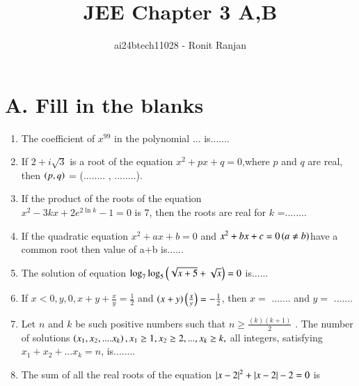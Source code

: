\documentclass[journal,12pt,twocolumn]{IEEEtran}
\theoremstyle{remark}
\begin{document}

\vspace{3cm}

\title{JEE Chapter 3 A,B}
\author{ai24btech11028 - Ronit Ranjan}
\maketitle
\newpage
\bigskip
\section*{A. Fill in the blanks}
\begin{enumerate}
    \item The coefficient of $x^{99}$ in the polynomial ...
    is.......\hfill {}
    
    \item If $2+i\sqrt{3}$ is a root of the equation $x^2 + px +q =0$,where $p$ and $q$ are real, then $\left(p,q\right)$ = (........ , ........).\hfill {}
    
    \item If the product of the roots of the equation\\ $x^2 -3kx +2e^{2\ln{k}} -1=0$ is $7$, then the roots are real for $k$ =........\hfill {}
    
    \item If the quadratic equation $x^2 + ax +b=0$ and $x^2 + bx + c=0 \left(a \ne b\right)$have a common root then value of a+b is......\hfill {}
    
    \item The solution of equation $\log_{7}\log_{5}\left(\sqrt{x+5}+\sqrt{x}\right)=0$ is......\hfill {}
    
    \item If $x<0, y,0, x + y + \frac{x}{y} = \frac{1}{2}$ and $\left(x+y\right)\left(\frac{x
    }{y}\right) = -\frac{1}{2}$, then $x=$ ....... and $y=$ .......\hfill {}
    
    \item Let $n$ and $k$ be such positive numbers such that $n \geq \frac{(k)(k+1)}{2}$ . The number of solutions $\left(x_1,x_2,....x_k\right), x_1 \geq 1, x_2 \geq 2,...,x_k \geq k, $ all integers, satisfying $x_1+x_2+...x_k = n$, is........  \hfill {}
    \item The sum of all the real roots of the equation $\left\vert x-2\right\vert^2+\left\vert x-2\right\vert-2 = 0$ is \hfill {}
\end{enumerate}
\end{document}
